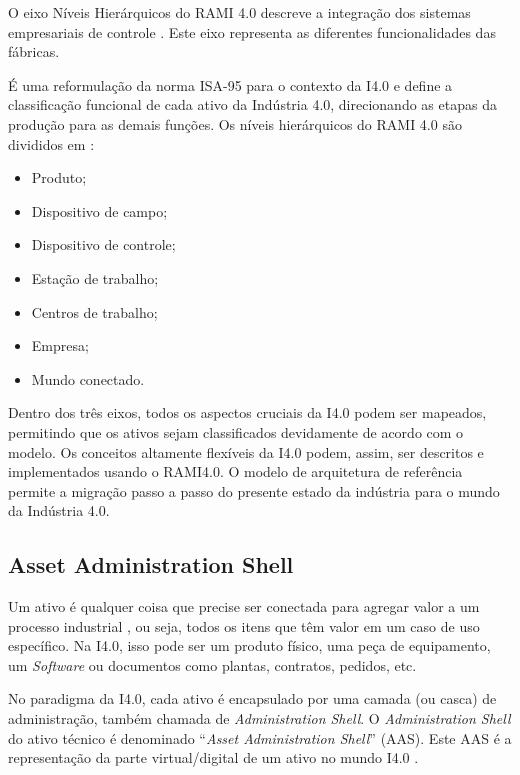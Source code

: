 	O eixo Níveis Hierárquicos do RAMI 4.0 descreve a integração dos sistemas empresariais de controle \cite{pisching2018arquitetura}. Este eixo representa as diferentes funcionalidades das fábricas.
	
	É uma reformulação da norma ISA-95 para o contexto da I4.0 e define a classificação funcional de cada ativo da Indústria 4.0, direcionando as etapas da produção para as demais funções. Os níveis hierárquicos do RAMI 4.0 são divididos em \cite{adolphs2015rami}:
	 
	\begin{itemize}
			\item Produto;
			\item Dispositivo de campo;
			\item Dispositivo de controle;
			\item Estação de trabalho;
			\item Centros de trabalho;
			\item Empresa;
			\item Mundo conectado.
	\end{itemize}
	
	
	Dentro dos três eixos, todos os aspectos cruciais da I4.0 podem ser mapeados, permitindo que os ativos sejam classificados devidamente de acordo com o modelo. Os conceitos altamente flexíveis da I4.0 podem, assim, ser descritos e implementados usando o RAMI4.0. O modelo de arquitetura de referência permite a migração passo a passo do presente estado da indústria para o mundo da Indústria 4.0.
	
	\subsection{Asset Administration Shell}
	
	Um ativo é qualquer coisa que precise ser conectada para agregar valor a um processo industrial \cite{bader2019aas}, ou seja, todos os itens que têm valor em um caso de uso específico. Na I4.0, isso pode ser um produto físico, uma peça de equipamento, um \textit{Software} ou documentos como plantas, contratos, pedidos, etc.
	
	No paradigma da I4.0, cada ativo é encapsulado por uma camada (ou casca) de administração, também chamada de \textit{Administration Shell}. O \textit{Administration Shell} do ativo técnico é denominado ``\textit{Asset Administration Shell}'' (AAS). Este AAS é a representação da parte virtual/digital de um ativo no mundo I4.0 \cite{ye2019aas}.
	
